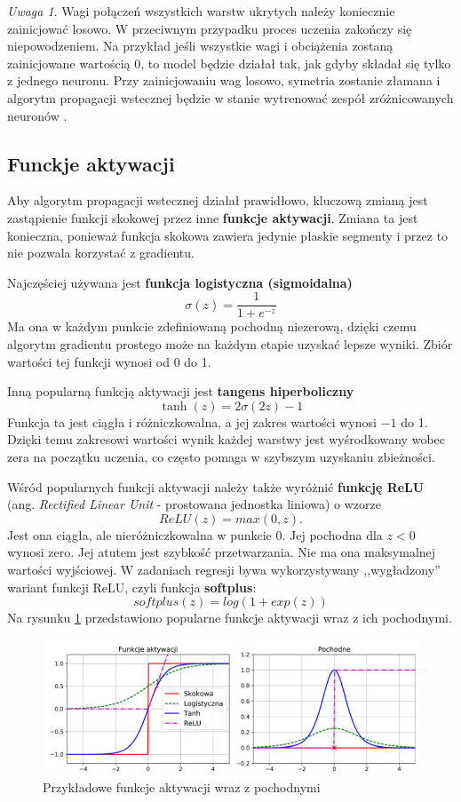 \documentclass[12pt]{mwbk}
\theoremstyle{plain}
\theoremstyle{definition}
\theoremstyle{remark}
\newtheorem{uwaga}{Uwaga}[chapter]
\newcommand\zrodlo[1]{\par\vspace{-3mm}{\small\textit{Źródło: }#1 }}
\begin{document}
\begin{uwaga}
	Wagi połączeń wszystkich warstw ukrytych należy koniecznie zainicjować losowo. W przeciwnym przypadku proces uczenia zakończy się niepowodzeniem. Na przykład jeśli wszystkie wagi i obciążenia zostaną zainicjowane wartością 0, to model będzie działał tak, jak gdyby składał się tylko z jednego neuronu. Przy zainicjowaniu wag losowo, symetria zostanie złamana i algorytm propagacji wstecznej będzie w stanie wytrenować zespół zróżnicowanych neuronów \cite{geron}. 
\end{uwaga}

\subsection{Funckje aktywacji}

Aby algorytm propagacji wstecznej działał prawidłowo, kluczową zmianą jest zastąpienie funkcji skokowej przez inne \textbf{funkcje aktywacji}. Zmiana ta jest konieczna, ponieważ funkcja skokowa zawiera jedynie płaskie segmenty i przez to nie pozwala korzystać z gradientu. 

Najczęściej używana jest \textbf{funkcja logistyczna (sigmoidalna)}
$$\sigma(z)=\frac{1}{1+e^{-z}}$$
Ma ona w każdym punkcie zdefiniowaną pochodną niezerową, dzięki czemu algorytm gradientu prostego może na każdym etapie uzyskać lepsze wyniki. Zbiór wartości tej funkcji wynosi od 0 do 1.

Inną popularną funkcją aktywacji jest \textbf{tangens hiperboliczny}
$$\operatorname{tanh}(z)=2\sigma(2z)-1$$
Funkcja ta jest ciągła i różniczkowalna, a jej zakres wartości wynosi $-1$ do 1. Dzięki temu zakresowi wartości wynik każdej warstwy jest wyśrodkowany wobec zera na początku uczenia, co często pomaga w szybszym uzyskaniu zbieżności.

Wśród popularnych funkcji aktywacji należy także wyróżnić  \textbf{funkcję ReLU} (ang. \emph{Rectified Linear Unit} - prostowana jednostka liniowa) o wzorze
$$ReLU(z)=max(0,z).$$
Jest ona ciągła, ale nieróżniczkowalna w punkcie 0. Jej pochodna dla $z<0$ wynosi zero. Jej atutem jest szybkość przetwarzania. Nie ma ona maksymalnej wartości wyjściowej.
W zadaniach regresji bywa wykorzystywany ,,wygładzony'' wariant funkcji ReLU, czyli funkcja \textbf{softplus}:
$$softplus(z)=log(1+exp(z))$$
Na  rysunku \ref{fig:funkcje-aktywacji} przedstawiono popularne funkcje aktywacji wraz z ich pochodnymi.

\begin{figure}[!h]
	\centering
	\includegraphics[width=\linewidth]{rys/funkcje_aktywacji.png}
	\caption{Przykładowe funkcje aktywacji wraz z pochodnymi}
	\zrodlo{\cite{geron}}
	\label{fig:funkcje-aktywacji}
\end{figure}
\end{document}
